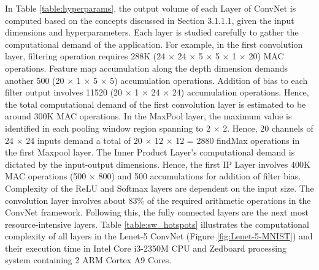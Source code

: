 In Table \ref{table:hyperparams}, the output volume of each Layer of ConvNet is computed based on the concepts discussed in Section 3.1.1.1, given the input dimensions and hyperparameters. Each layer is studied carefully to gather the computational demand of the application. \newline \newline
For example, in the first convolution layer, filtering operation requires 288K (24 $\times$ 24 $\times$ 5 $\times$ 5 $\times$ 1 $\times$ 20) MAC operations. Feature map accumulation along the depth dimension demands another 500 (20 $\times$ 1 $\times$ 5 $\times$ 5) accumulation operations. Addition of bias to each filter output involves 11520 (20 $\times$ 1 $\times$ 24 $\times$ 24) accumulation operations. Hence, the total computational demand of the first convolution layer is estimated to be around 300K MAC operations. \newline \newline
In the MaxPool layer, the maximum value is identified in each pooling window region spanning to 2 $\times$ 2. Hence, 20 channels of 24 $\times$ 24 inputs demand a total of 20 $\times$ 12 $\times$ 12 = 2880 findMax operations in the first Maxpool layer.  The Inner Product Layer’s computational demand is dictated by the input-output dimensions. Hence, the first IP Layer involves 400K MAC operations (500 $\times$ 800) and 500 accumulations for addition of filter bias. Complexity of the ReLU and Softmax layers are dependent on the input size. \newline \newline
The convolution layer involves about 83\% of the required arithmetic operations in the ConvNet framework. Following this, the fully connected layers are the next most resource-intensive layers. \newline \newline
Table \ref{table:sw_hotspots} illustrates the computational complexity of all layers in the Lenet-5 ConvNet (Figure \ref{fig:Lenet-5-MNIST}) and their execution time in Intel Core i3-2350M CPU and Zedboard processing system containing 2 ARM Cortex A9 Cores.\newline

